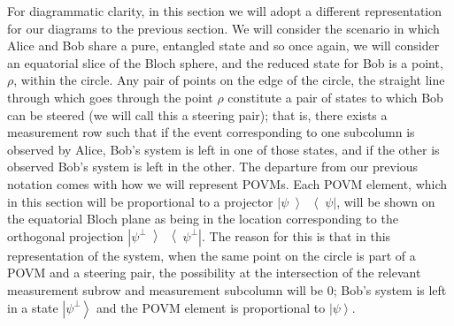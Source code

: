 \documentclass[reprint]{revtex4-1}
\theoremstyle{definition}
\newcommand{\ket}[1]{{\left\vert{#1}\right\rangle}}
\newcommand{\ketbra}[1]{{\left| #1 \middle>\middle< #1 \right|}}
\begin{document}
For diagrammatic clarity, in this section we will adopt a different representation for our diagrams to the previous section. We will consider the scenario in which Alice and Bob share a pure, entangled state and so once again, we will consider an equatorial slice of the Bloch sphere, and the reduced state for Bob is a point, $\rho$, within the circle. Any pair of points on the edge of the circle, the straight line through which goes through the point $\rho$ constitute a pair of states to which Bob can be steered (we will call this a steering pair); that is, there exists a measurement row such that if the event corresponding to one subcolumn is observed by Alice, Bob's system is left in one of those states, and if the other is observed Bob's system is left in the other. The departure from our previous notation comes with how we will represent POVMs. Each POVM element, which in this section will be proportional to a projector $\ketbra{\psi}$, will be shown on the equatorial Bloch plane as being in the location corresponding to the orthogonal projection $\ketbra{\psi^\perp}$. The reason for this is that in this representation of the system, when the same point on the circle is part of a POVM and a steering pair, the possibility at the intersection of the relevant measurement subrow and measurement subcolumn will be 0; Bob's system is left in a state $\ket{\psi^\perp}$ and the POVM element is proportional to $\ket{\psi}$.

\end{document}
